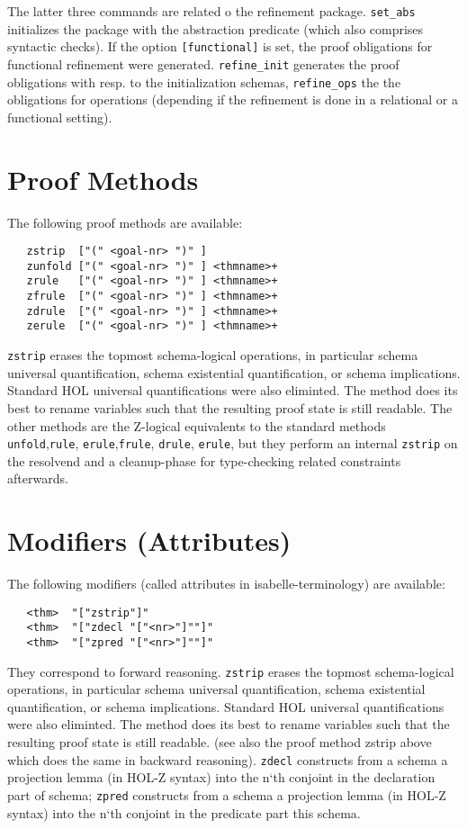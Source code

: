 \documentclass[10pt,a4paper,bigheadings,pdftex,bibtotoc,chapterprefix,appendixprefix,twoside,DIVcalc]{scrbook}
\begin{document}
The latter three commands are related o the refinement package. \verb+set_abs+ initializes
the package with the abstraction predicate (which also comprises syntactic checks). If the option
\verb+[functional]+ is set, the proof obligations for functional refinement were generated.
\verb+refine_init+ generates the proof obligations with resp. to the initialization schemas,
 \verb+refine_ops+ the the obligations for operations (depending if the refinement is done
in a relational or a functional setting).

\section{Proof Methods}
The following proof methods are available:
\begin{verbatim}
   zstrip  ["(" <goal-nr> ")" ]
   zunfold ["(" <goal-nr> ")" ] <thmname>+
   zrule   ["(" <goal-nr> ")" ] <thmname>+
   zfrule  ["(" <goal-nr> ")" ] <thmname>+
   zdrule  ["(" <goal-nr> ")" ] <thmname>+
   zerule  ["(" <goal-nr> ")" ] <thmname>+
\end{verbatim}
\verb+zstrip+ erases the topmost schema-logical operations, in
particular schema universal quantification, schema existential
quantification, or schema implications. Standard HOL universal
quantifications were also eliminted. The method does its best to
rename variables such that the resulting proof state is still
readable.  The other methods are the Z-logical equivalents to the
standard methods \verb+unfold+,\verb+rule+, \verb+erule+,\verb+frule+,
\verb+drule+, \verb+erule+, but they perform an internal \verb+zstrip+
on the resolvend and a cleanup-phase for type-checking related
constraints afterwards.

\section{Modifiers (Attributes)}
The following modifiers (called attributes in isabelle-terminology) are available:
\begin{verbatim}
   <thm>  "["zstrip"]"
   <thm>  "["zdecl "["<nr>"]""]"
   <thm>  "["zpred "["<nr>"]""]"   
\end{verbatim}
They correspond to forward reasoning.  \verb+zstrip+ erases the
topmost schema-logical operations, in particular schema universal
quantification, schema existential quantification, or schema
implications. Standard HOL universal quantifications were also
eliminted. The method does its best to rename variables such that the
resulting proof state is still readable. (see also the proof method
zstrip above which does the same in backward reasoning).  \verb+zdecl+
constructs from a schema a projection lemma (in HOL-Z syntax) into the
n`th conjoint in the declaration part of schema; \verb+zpred+
constructs from a schema a projection lemma (in HOL-Z syntax) into the
n`th conjoint in the predicate part this schema.
\end{document}
